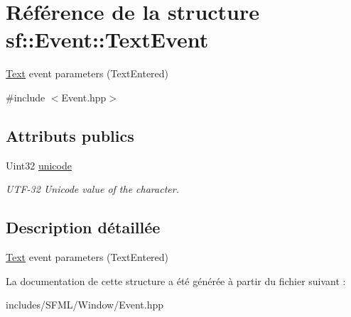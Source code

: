\hypertarget{structsf_1_1Event_1_1TextEvent}{}\section{Référence de la structure sf\+:\+:Event\+:\+:Text\+Event}
\label{structsf_1_1Event_1_1TextEvent}


\hyperlink{classsf_1_1Text}{Text} event parameters (Text\+Entered)  




{\ttfamily \#include $<$Event.\+hpp$>$}

\subsection*{Attributs publics}
\begin{DoxyCompactItemize}
\item 
\mbox{\label{structsf_1_1Event_1_1TextEvent_a00d96b1a5328a1d7cbc276e161befcb0}} 
Uint32 \hyperlink{structsf_1_1Event_1_1TextEvent_a00d96b1a5328a1d7cbc276e161befcb0}{unicode}
\begin{DoxyCompactList}\small\item\em U\+T\+F-\/32 Unicode value of the character. \end{DoxyCompactList}\end{DoxyCompactItemize}


\subsection{Description détaillée}
\hyperlink{classsf_1_1Text}{Text} event parameters (Text\+Entered) 

La documentation de cette structure a été générée à partir du fichier suivant \+:\begin{DoxyCompactItemize}
\item 
includes/\+S\+F\+M\+L/\+Window/Event.\+hpp\end{DoxyCompactItemize}
